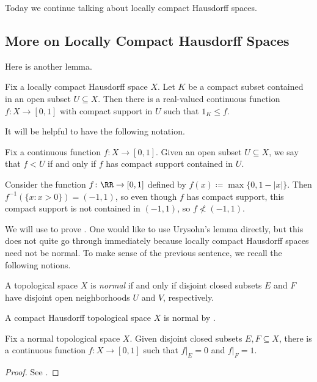 \documentclass[../notes.tex]{subfiles}
\begin{document}
Today we continue talking about locally compact Hausdorff spaces.

\subsection{More on Locally Compact Hausdorff Spaces}
Here is another lemma.
\begin{lemma} \label{lem:lch-urysohn}
	Fix a locally compact Hausdorff space $X$. Let $K$ be a compact subset contained in an open subset $U\subseteq X$. Then there is a real-valued continuous function $f\colon X\to[0,1]$ with compact support in $U$ such that $1_K\le f$.
\end{lemma}
It will be helpful to have the following notation.
\begin{definition}
	Fix a continuous function $f\colon X\to[0,1]$. Given an open subset $U\subseteq X$, we say that $f<U$ if and only if $f$ has compact support contained in $U$.
\end{definition}
\begin{nex}
	Consider the function $f\colon\RR\to[0,1]$ defined by $f(x)\coloneqq\max\{0,1-\left|x\right|\}$. Then $f^{-1}(\{x:x>0\})=(-1,1)$, so even though $f$ has compact support, this compact support is not contained in $(-1,1)$, so $f\not<(-1,1)$.
\end{nex}
We will use  to prove . One would like to use Urysohn's lemma directly, but this does not quite go through immediately because locally compact Hausdorff spaces need not be normal. To make sense of the previous sentence, we recall the following notions.
\begin{definition}[normal]
	A topological space $X$ is \textit{normal} if and only if disjoint closed subsets $E$ and $F$ have disjoint open neighborhoods $U$ and $V$, respectively.
\end{definition}
\begin{example} \label{ex:ch-is-normal}
	A compact Hausdorff topological space $X$ is normal by \cite[Proposition~4.18]{elber-top}.
\end{example}
\begin{theorem} \label{thm:urysohn}
	Fix a normal topological space $X$. Given disjoint closed subsets $E,F\subseteq X$, there is a continuous function $f\colon X\to[0,1]$ such that $f|_E=0$ and $f|_F=1$.
\end{theorem}
\begin{proof}
	See \cite[Theorem~3.8]{elber-top}.
\end{proof}
\end{document}
